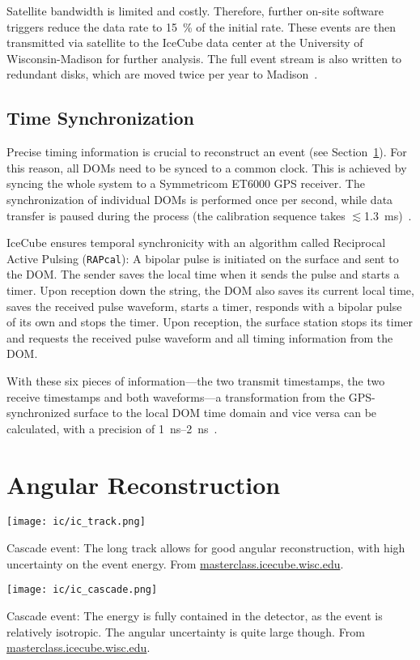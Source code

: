 Satellite bandwidth is limited and costly. Therefore, further on-site software triggers reduce the data rate to \SI{15}{\percent} of the initial rate. These events are then transmitted via satellite to the IceCube data center at the University of Wisconsin-Madison for further analysis. The full event stream is also written to redundant disks, which are moved twice per year to Madison~\cite{Aartsen2017}.

\subsection{Time Synchronization}
Precise timing information is crucial to reconstruct an event (see Section~\ref{reconstruction}). For this reason, all DOMs need to be synced to a common clock. This is achieved by syncing the whole system to a Symmetricom ET6000 GPS receiver. The synchronization of individual DOMs is performed once per second, while data transfer is paused during the process (the calibration sequence takes $\lesssim$\SI{1.3}{\milli\second})~.

IceCube ensures temporal synchronicity with an algorithm called Reciprocal Active Pulsing (\texttt{RAPcal}): A bipolar pulse is initiated on the surface and sent to the DOM. The sender saves the local time when it sends the pulse and starts a timer. Upon reception down the string, the DOM also saves its current local time, saves the received pulse waveform, starts a timer, responds with a bipolar pulse of its own and stops the timer. Upon reception, the surface station stops its timer and requests the received pulse waveform and all timing information from the DOM.

With these six pieces of information---the two transmit timestamps, the two receive timestamps and both waveforms---a transformation from the GPS-synchronized surface to the local DOM time domain and vice versa can be calculated, with a precision of \SIrange{1}{2}{\ns}~\cite{Abbasi2009}.

\section{Angular Reconstruction}\label{reconstruction}

\begin{marginfigure}
    \texttt{[image: ic/ic\_track.png]}
    \caption[Track event in IceCube]{Cascade event: The long track allows for good angular reconstruction, with high uncertainty on the event energy. From \url{masterclass.icecube.wisc.edu}.}
\end{marginfigure}
\begin{marginfigure}
    \texttt{[image: ic/ic\_cascade.png]}
    \caption[Cascade event in IceCube]{Cascade event: The energy is fully contained in the detector, as the event is relatively isotropic. The angular uncertainty is quite large though. From \url{masterclass.icecube.wisc.edu}.}
\end{marginfigure}

